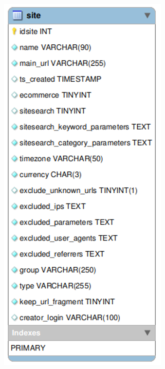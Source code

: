 \begin{figure}[H]
    \centering
    \begin{minipage}{0.48\textwidth}
        \centering
        \includegraphics[width=\textwidth]{images/site.png}

\end{minipage}
\end{figure}
